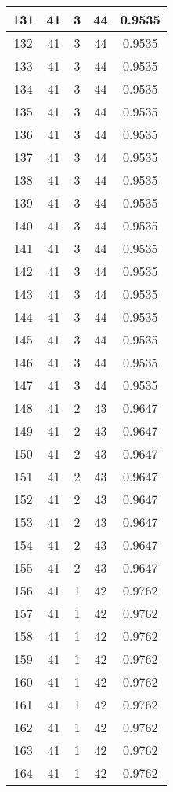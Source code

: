 \documentclass[letterpaper, 12pt]{article}
\begin{document}
\begin{longtable}{|c|c|c|c|c|}
\hline
131 & 41 & 3 & 44 & 0.9535 \\
\hline
132 & 41 & 3 & 44 & 0.9535 \\
\hline
133 & 41 & 3 & 44 & 0.9535 \\
\hline
134 & 41 & 3 & 44 & 0.9535 \\
\hline
135 & 41 & 3 & 44 & 0.9535 \\
\hline
136 & 41 & 3 & 44 & 0.9535 \\
\hline
137 & 41 & 3 & 44 & 0.9535 \\
\hline
138 & 41 & 3 & 44 & 0.9535 \\
\hline
139 & 41 & 3 & 44 & 0.9535 \\
\hline
140 & 41 & 3 & 44 & 0.9535 \\
\hline
141 & 41 & 3 & 44 & 0.9535 \\
\hline
142 & 41 & 3 & 44 & 0.9535 \\
\hline
143 & 41 & 3 & 44 & 0.9535 \\
\hline
144 & 41 & 3 & 44 & 0.9535 \\
\hline
145 & 41 & 3 & 44 & 0.9535 \\
\hline
146 & 41 & 3 & 44 & 0.9535 \\
\hline
147 & 41 & 3 & 44 & 0.9535 \\
\hline
148 & 41 & 2 & 43 & 0.9647 \\
\hline
149 & 41 & 2 & 43 & 0.9647 \\
\hline
150 & 41 & 2 & 43 & 0.9647 \\
\hline
151 & 41 & 2 & 43 & 0.9647 \\
\hline
152 & 41 & 2 & 43 & 0.9647 \\
\hline
153 & 41 & 2 & 43 & 0.9647 \\
\hline
154 & 41 & 2 & 43 & 0.9647 \\
\hline
155 & 41 & 2 & 43 & 0.9647 \\
\hline
156 & 41 & 1 & 42 & 0.9762 \\
\hline
157 & 41 & 1 & 42 & 0.9762 \\
\hline
158 & 41 & 1 & 42 & 0.9762 \\
\hline
159 & 41 & 1 & 42 & 0.9762 \\
\hline
160 & 41 & 1 & 42 & 0.9762 \\
\hline
161 & 41 & 1 & 42 & 0.9762 \\
\hline
162 & 41 & 1 & 42 & 0.9762 \\
\hline
163 & 41 & 1 & 42 & 0.9762 \\
\hline
164 & 41 & 1 & 42 & 0.9762 \\

\end{longtable}
\end{document}
